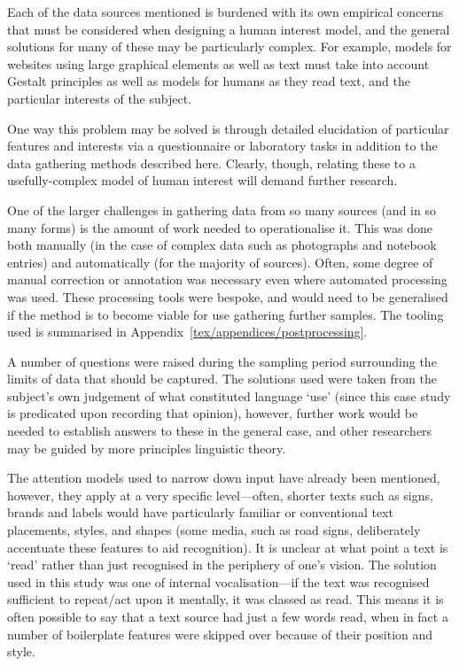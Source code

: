 Each of the data sources mentioned is burdened with its own empirical concerns that must be considered when designing a human interest model, and the general solutions for many of these may be particularly complex.  For example, models for websites using large graphical elements as well as text must take into account Gestalt principles as well as models for humans as they read text, and the particular interests of the subject.

One way this problem may be solved is through detailed elucidation of particular features and interests via a questionnaire or laboratory tasks in addition to the data gathering methods described here.  Clearly, though, relating these to a usefully-complex model of human interest will demand further research.




One of the larger challenges in gathering data from so many sources (and in so many forms) is the amount of work needed to operationalise it.  This was done both manually (in the case of complex data such as photographs and notebook entries) and automatically (for the majority of sources).  Often, some degree of manual correction or annotation was necessary even where automated processing was used.  These processing tools were bespoke, and would need to be generalised if the method is to become viable for use gathering further samples.  The tooling used is summarised in Appendix~\ref{tex/appendices/postprocessing}.



A number of questions were raised during the sampling period surrounding the limits of data that should be captured.  The solutions used were taken from the subject's own judgement of what constituted language `use' (since this case study is predicated upon recording that opinion), however, further work would be needed to establish answers to these in the general case, and other researchers may be guided by more principles linguistic theory.


The attention models used to narrow down input have already been mentioned, however, they apply at a very specific level---often, shorter texts such as signs, brands and labels would have particularly familiar or conventional text placements, styles, and shapes (some media, such as road signs, deliberately accentuate these features to aid recognition).  It is unclear at what point a text is `read' rather than just recognised in the periphery of one's vision.  The solution used in this study was one of internal vocalisation---if the text was recognised sufficient to repeat/act upon it mentally, it was classed as read.  This means it is often possible to say that a text source had just a few words read, when in fact a number of boilerplate features were skipped over because of their position and style.


